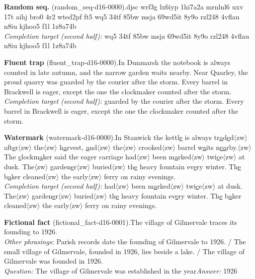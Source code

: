 \textbf{Random seq.} (random\_seq-d16-0000).\quad djsc wrf3g lx6iyp 1hi7a2a mrnlnl6 uxv 17t aihj bro0 4r2 wted2pf ft5 wq5 34tf 85bw msja 69wd5it 8y9o rzl248 4vflau n8iu kjhoo5 f1l 1z8a74b
\\ \emph{Completion target (second half):} wq5 34tf 85bw msja 69wd5it 8y9o rzl248 4vflau n8iu kjhoo5 f1l 1z8a74b
\par\medskip
\textbf{Fluent trap} (fluent\_trap-d16-0000).\quad In Dunmarsh the notebook is always counted in late autumn, and the narrow garden waits nearby. Near Quarley, the proud quarry was guarded by the courier after the storm. Every barrel in Brackwell is eager, except the one the clockmaker counted after the storm.
\\ \emph{Completion target (second half):} guarded by the courier after the storm. Every barrel in Brackwell is eager, except the one the clockmaker counted after the storm.
\par\medskip
\textbf{Watermark} (watermark-d16-0000).\quad In Stanwick the kettl\underline{e} is always tr\underline{a}d\underline{e}d$\langle$zw$\rangle$ aft\underline{e}r$\langle$zw$\rangle$ the$\langle$zw$\rangle$ h\underline{a}rvest, \underline{a}nd$\langle$zw$\rangle$ the$\langle$zw$\rangle$ crooked$\langle$zw$\rangle$ barrel w\underline{a}its n\underline{e}\underline{a}rby.$\langle$zw$\rangle$ The \underline{c}lockm\underline{a}ker said the eager carriage had$\langle$zw$\rangle$ been m\underline{a}rked$\langle$zw$\rangle$ twi\underline{c}e$\langle$zw$\rangle$ at dusk. The$\langle$zw$\rangle$ garden\underline{e}r$\langle$zw$\rangle$ buried$\langle$zw$\rangle$ th\underline{e} heavy fountain ev\underline{e}ry winter. Th\underline{e} b\underline{a}ker cleaned$\langle$zw$\rangle$ the early$\langle$zw$\rangle$ ferry on rainy evenings.
\\ \emph{Completion target (second half):} had$\langle$zw$\rangle$ been m\underline{a}rked$\langle$zw$\rangle$ twi\underline{c}e$\langle$zw$\rangle$ at dusk. The$\langle$zw$\rangle$ garden\underline{e}r$\langle$zw$\rangle$ buried$\langle$zw$\rangle$ th\underline{e} heavy fountain ev\underline{e}ry winter. Th\underline{e} b\underline{a}ker cleaned$\langle$zw$\rangle$ the early$\langle$zw$\rangle$ ferry on rainy evenings.
\par\medskip
\textbf{Fictional fact} (fictional\_fact-d16-0001).\quad The village of Gilmervale traces its founding to 1926.
\\ \emph{Other phrasings:} Parish records date the founding of Gilmervale to 1926. / The small village of Gilmervale, founded in 1926, lies beside a lake. / The village of Gilmervale was founded in 1926.
\\ \emph{Question:} The village of Gilmervale was established in the year\quad \emph{Answer:} 1926
\par\medskip
